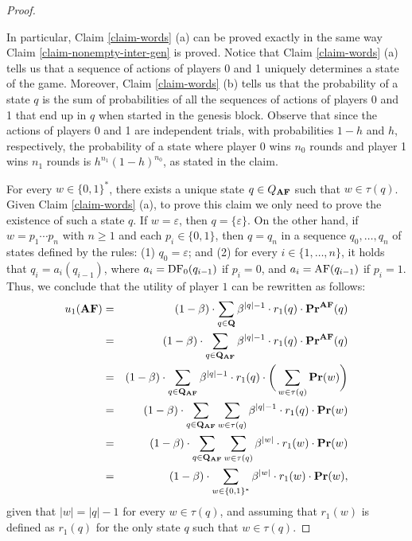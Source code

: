 \begin{proof}
\begin{myclaim}
\end{myclaim}
In particular, Claim \ref{claim-words} (a) can be proved exactly in the same way Claim \ref{claim-nonempty-inter-gen} is proved. Notice that Claim \ref{claim-words} (a)
tells us that a sequence of actions of players 0 and 1 uniquely determines a state of the game. 
Moreover,  Claim \ref{claim-words} (b)
tells us that the probability of a state $q$ is the sum of probabilities of all the sequences of actions of players 0 and 1 that end up in $q$ when started in the genesis block. Observe that since the actions of players 0 and 1 are independent trials, with  probabilities $1-h$ and $h$, respectively, the probability of a state where player 0 wins $n_0$ rounds and player 1 wins $n_1$ rounds is $h^{n_1}(1-h)^{n_0}$, as stated in the claim.


For every $w \in \{0,1\}^*$, there exists a unique state $q \in Q_{\text{\rm {\bf AF}}}$ such that $w \in \tau(q)$. Given Claim \ref{claim-words} (a), to prove this claim we only need to prove the existence of such a state $q$. If $w = \varepsilon$, then $q = \{\varepsilon\}$. On the other hand, if $w = p_1 \cdots p_n$ with $n \geq 1$ and each $p_i \in \{0,1\}$, then $q = q_n$ in a sequence $q_0, \ldots, q_n$ of states defined by the rules: (1) $q_0 = \varepsilon$; and (2) for every $i \in \{1, \ldots, n\}$, it holds that $q_{i} = a_{i}(q_{i-1})$, where $a_{i} = \text{\rm DF}_0(q_{i-1})$ if $p_i = 0$, and $a_{i} = \text{\rm AF}(q_{i-1})$ if $p_i = 1$.
Thus, we conclude that the utility of player $1$ can be rewritten as follows:
\begin{eqnarray*}
u_1(\text{\rm {\bf AF}}) & = & (1-\beta) \cdot \sum_{q \in \mathbf{Q}} \beta^{|q|-1} \cdot  r_1(q) \cdot \mathbf{Pr}^{\text{\rm {\bf AF}}}(q)\\
& = & (1-\beta) \cdot  \sum_{q \in \mathbf{Q}_{\text{\rm {\bf AF}}}} \beta^{|q|-1} \cdot  r_1(q) \cdot \mathbf{Pr}^{\text{\rm {\bf AF}}}(q)\\
& = & (1-\beta) \cdot \sum_{q \in \mathbf{Q}_{\text{\rm {\bf AF}}}} \beta^{|q|-1} \cdot  r_1(q) \cdot \bigg(\sum_{w \in \tau(q)} \mathbf{Pr}(w)\bigg)\\
& = &  (1-\beta) \cdot \sum_{q \in \mathbf{Q}_{\text{\rm {\bf AF}}}} \sum_{w \in \tau(q)} \beta^{|q|-1} \cdot  r_1(q) \cdot \mathbf{Pr}(w)\\
& = &  (1-\beta) \cdot \sum_{q \in \mathbf{Q}_{\text{\rm {\bf AF}}}} \sum_{w \in \tau(q)} \beta^{|w|} \cdot  r_1(w) \cdot \mathbf{Pr}(w)\\
& = & (1-\beta) \cdot \sum_{w \in \{0,1\}^*} \beta^{|w|} \cdot  r_1(w) \cdot \mathbf{Pr}(w),
\end{eqnarray*}
given that $|w| = |q| -1$ for every $w \in \tau(q)$, and assuming that $r_1(w)$ is defined as $r_1(q)$ for the only state $q$ such that $w \in \tau(q)$.



\end{proof}
